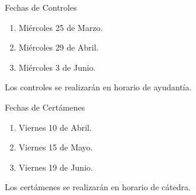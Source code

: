 

\begin{frame}
  \begin{block}{Fechas de Controles}
    \begin{enumerate}
        \item[$Q_1$] Miércoles 25 de Marzo.
        \item[$Q_2$] Miércoles 29 de Abril.
        \item[$Q_3$] Miércoles  3 de Junio.
    \end{enumerate}
  \end{block}
  \vspace{3mm}
  Los controles se realizarán en horario de ayudantía.\\
\end{frame}


\begin{frame}
  \begin{block}{Fechas de Certámenes}
    \begin{enumerate}
      \item[$C_1$] Viernes 10 de Abril.
      \item[$C_2$] Viernes 15 de Mayo.
      \item[$C_3$] Viernes 19 de Junio.
    \end{enumerate}
  \end{block}
  \vspace{3mm}
  Los certámenes se realizarán en horario de cátedra.
\end{frame}

